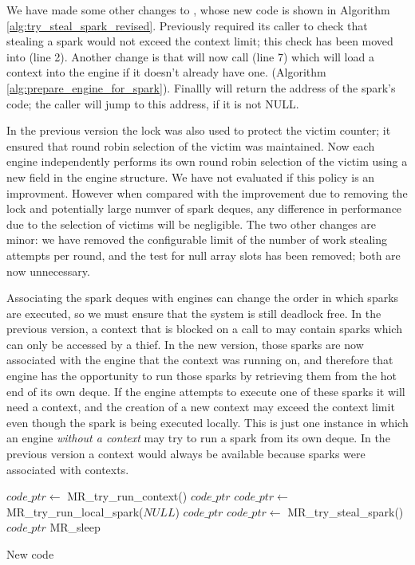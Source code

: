 We have made some other changes to \trystealspark,
whose new code is shown in Algorithm \ref{alg:try_steal_spark_revised}.
Previously \trystealspark required its caller to check that stealing a spark
would not exceed the context limit;
this check has been moved into \trystealspark (line 2).
Another change is that \trystealspark
will now call \prepareengineforspark (line 7)
which will load a context into the engine if it doesn't already have one.
(Algorithm \ref{alg:prepare_engine_for_spark}).
Finallly \trystealspark will return the address of the spark's code;
the caller will jump to this address,
if it is not NULL.

In the previous version the lock was also used to protect the victim
counter;
it ensured that round robin selection of the victim was maintained.
Now each engine independently performs its own round robin selection of the
victim using a new field  in the engine structure.
We have not evaluated if this policy is an improvment.
However when compared with the improvement due to removing the lock and
potentially large numver of spark deques,
any difference in performance due to the selection of victims will be
negligible.
The two other changes are minor:
we have removed the configurable limit of the number of work stealing
attempts per round,
and the test for null array slots has been removed;
both are now unnecessary.

Associating the spark deques with engines can change the order in which
sparks are executed,
so we must ensure that the system is still deadlock free.
In the previous version,
a context that is blocked on a call to \wait may contain sparks
which can only be accessed by a thief.
In the new version,
those sparks are now associated with the engine that the context was running
on,
and therefore that engine has the opportunity to run those sparks by
retrieving them from the hot end of its own deque.
If the engine attempts to execute one of these sparks it will need a
context,
and the creation of a new context may exceed the context limit even though
the spark is being executed locally.
This is just one instance in which an engine \emph{without a context}
may try to run a spark from its own deque.
In the previous version a context would always be available because sparks
were associated with contexts.

\begin{algorithm}[tbp]
\begin{algorithmic}
        \State $code\_ptr \gets$ MR\_try\_run\_context()
            \Goto $code\_ptr$
        \EndIf
        \State $code\_ptr \gets$ MR\_try\_run\_local\_spark($NULL$)
            \Goto $code\_ptr$
        \EndIf
        \State $code\_ptr \gets$ MR\_try\_steal\_spark()
            \Goto $code\_ptr$
        \EndIf
        \Goto MR\_sleep
    \EndProcedure
\end{algorithmic}
\caption{New \idle code}
\label{alg:idle_entry_point}
\end{algorithm}

